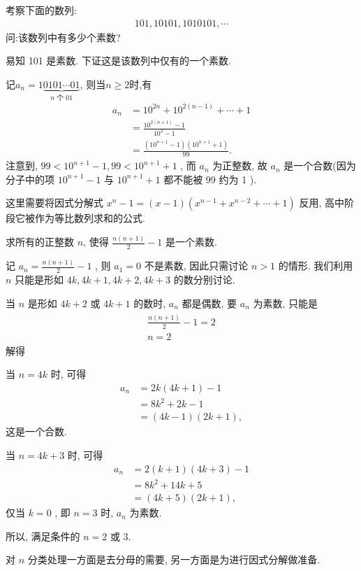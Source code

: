 \begin{example}
	考察下面的数列:
	\begin{align*}
		101,10101,1010101, \cdots
	\end{align*}
	问:该数列中有多少个素数?
\end{example}
\begin{solution}
	易知 101 是素数. 下证这是该数列中仅有的一个素数.

	记$a_{n}=1\underbrace{0101 \cdots 01}_{n \text { 个 } 01} $, 则当$n \geqslant 2$时,有
	\begin{align*}
		a_{n} & =10^{2 n}+10^{2(n-1)}+\cdots+1                               \\
		      & =\frac{10^{2(n+1)}-1}{10^{2}-1}                              \\
		      & =\frac{\left(10^{n+1}-1\right)\left(10^{n+1}+1\right)}{99} .
	\end{align*}
	注意到,  $99<10^{n+1}-1,99<10^{n+1}+1$ , 而 $a_{n}$ 为正整数, 故 $a_{n}$ 是一个合数(因为分子中的项 $10^{n+1}-1$ 与 $10^{n+1}+1$ 都不能被 99 约为 1 ).
\end{solution}
\begin{note}
	这里需要将因式分解式 $x^{n}-1=(x-1)\left(x^{n-1}+x^{n-2}+\cdots+1\right)$ 反用, 高中阶段它被作为等比数列求和的公式.
\end{note}

\begin{example}
	求所有的正整数 $n$, 使得 $\frac{n(n+1)}{2}-1$ 是一个素数.
\end{example}
\begin{solution}
	记 $a_{n}=\frac{n(n+1)}{2}-1$ , 则 $a_{1}=0$ 不是素数, 因此只需讨论 $n>1$ 的情形. 我们利用 $n$ 只能是形如 $4 k ,  4 k+1 ,  4 k+2 ,  4 k+3$ 的数分别讨论.

	当 $n$ 是形如 $4 k+2$ 或 $4 k+1$ 的数时, $a_{n}$ 都是偶数, 要 $a_{n}$ 为素数, 只能是
	\begin{align*}
		\begin{gathered}
			\frac{n(n+1)}{2}-1=2 \\
			n=2
		\end{gathered}
	\end{align*}
	解得

	当 $n=4 k$ 时, 可得\begin{align}
		a_{n} & =2 k(4 k+1)-1    \\
		      & =8 k^{2}+2 k-1   \\
		      & =(4 k-1)(2 k+1),
	\end{align}
	这是一个合数.

	当 $n=4 k+3$ 时, 可得
  \begin{align}
		a_{n} & =2(k+1)(4 k+3)-1 \\
		      & =8 k^{2}+14 k+5  \\
		      & =(4 k+5)(2 k+1),
	\end{align}
	仅当 $k=0$ , 即 $n=3$ 时,  $a_{n}$ 为素数.

	所以, 满足条件的 $n=2$ 或 $3$.
\end{solution}
\begin{note}
	对 $n$ 分类处理一方面是去分母的需要, 另一方面是为进行因式分解做准备.
\end{note}

